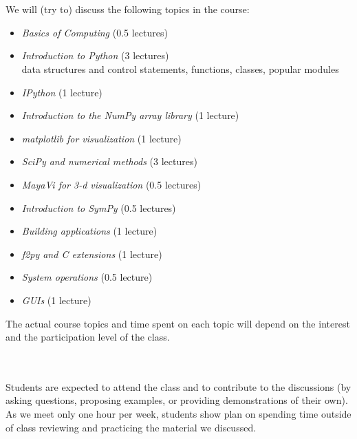 \documentclass[11pt]{article}
\begin{document}
\ \\
 \\
We will (try to) discuss the following topics in the course:
\begin{itemize}
\item {\em Basics of Computing} (0.5 lectures) 

\item {\em Introduction to Python} (3 lectures) \\
     data structures and control statements, functions, classes, popular modules

\item {\em IPython} (1 lecture)

\item {\em Introduction to the NumPy array library} (1 lecture)

\item {\em matplotlib for visualization} (1 lecture)

\item {\em SciPy and numerical methods} (3 lectures)

\item {\em MayaVi for 3-d visualization} (0.5 lectures)

\item {\em Introduction to SymPy} (0.5 lectures)

\item {\em Building applications} (1 lecture)

\item {\em f2py and C extensions} (1 lecture)

\item {\em System operations} (0.5 lecture)

\item {\em GUIs} (1 lecture)

\end{itemize}

\noindent The actual course topics and time spent on each topic will depend on the
interest and the participation level of the class.

\ \\
 \\
Students are expected to attend the class and to contribute
to the discussions (by asking questions, proposing examples, or
providing demonstrations of their own).  As we meet only one hour per
week, students show plan on spending time outside of class reviewing
and practicing the material we discussed. 
\end{document}
